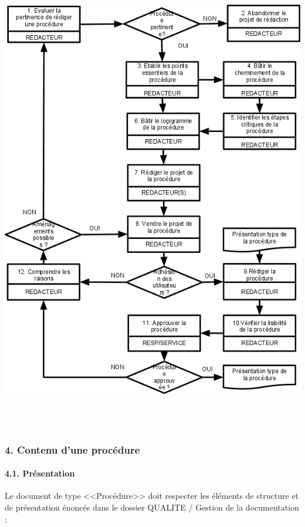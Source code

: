 \documentclass{article}
\begin{document}
 \includegraphics[width=15.637cm,height=20.535cm]{BP1-img2.png} 

\subsubsection[4. Contenu d’une procédure]{4. Contenu d’une procédure}
\paragraph[4.1. Présentation]{4.1. Présentation}

\bigskip

Le document de type
{\textless}{\textless}Procédure{\textgreater}{\textgreater} doit
respecter les éléments de structure et de présentation énoncés dans le
dossier QUALITE / Gestion de la documentation :
\end{document}
